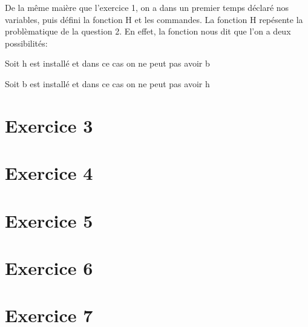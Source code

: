 \documentclass{article}
\begin{document}
De la même maière que l'exercice 1, on a dans un premier temps déclaré nos variables, puis défini la fonction H et
les commandes. La fonction H repésente la problèmatique de la question 2. En effet, la fonction nous dit que l'on
a deux possibilités:\\
\par Soit h est installé et dans ce cas on ne peut pas avoir b
\par Soit b est installé et dans ce cas on ne peut pas avoir h

\section*{Exercice 3}
\section*{Exercice 4}
\section*{Exercice 5}
\section*{Exercice 6}
\section*{Exercice 7}
\end{document}
